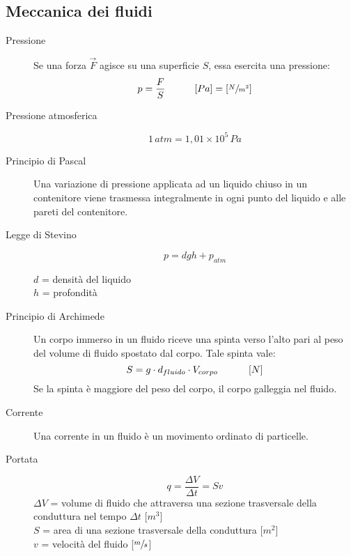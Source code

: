 \documentclass[a4paper,11pt,italian]{article}
\begin{document}
\subsection{Meccanica dei fluidi}

\begin{description}
  \item[Pressione] 
  Se una forza $ \vec{F} $ agisce su una superficie $ S $, essa esercita una pressione:
  \[ p = \frac{F}{S} \hspace*{3em} [Pa] = \left[ \sfrac{N}{m^2} \right] \]
  
  \item[Pressione atmosferica]
  \[ 1 \, atm = 1,01 \times 10^5 \, Pa \]
  
  \item[Principio di Pascal] 
  Una variazione di pressione applicata ad un liquido chiuso in un contenitore viene trasmessa integralmente in ogni punto del liquido e alle pareti del contenitore.
  
  \item[Legge di Stevino]
  \[ p = dgh + p_{atm} \]
  \begin{multicols}{2}
  $ d $ = densità del liquido\\
  $ h $ = profondità
  \end{multicols}
  
  \item[Principio di Archimede] 
  Un corpo immerso in un fluido riceve una spinta verso l'alto pari al peso del volume di fluido spostato dal corpo. Tale spinta vale:
  \[ S = g \cdot d_{fluido} \cdot V_{corpo} \hspace*{3em} \left[ N \right] \]
  Se la spinta è maggiore del peso del corpo, il corpo galleggia nel fluido.
  
  \item[Corrente] 
  Una corrente in un fluido è un movimento ordinato di particelle.
  
  \item[Portata]
  \[ q = \frac{\Delta V}{\Delta t} = Sv \]
  $ \Delta V $ = volume di fluido che attraversa una sezione trasversale della conduttura nel tempo $ \Delta t $ [$ m^3 $]\\
  $ S $ = area di una sezione trasversale della conduttura [$ m^2 $]\\
  $ v $ = velocità del fluido [$ \sfrac{m}{s} $]


\end{description}
\end{document}

